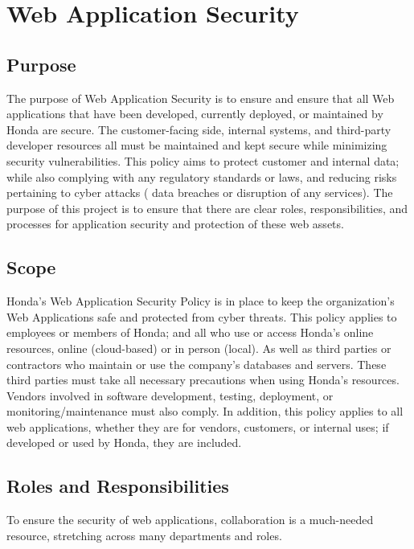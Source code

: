 \chapter{Web Application Security}
\pagestyle{fancy}

\fancyhf{}

\fancyfoot[C]{\thepage}

\renewcommand{\headrulewidth}{0pt}
\renewcommand{\footrulewidth}{0pt}

\section{Purpose}
The purpose of Web Application Security is to ensure and ensure that all Web applications that have been developed, currently deployed, or maintained by Honda are secure.  The customer-facing side, internal systems, and third-party developer resources all must be maintained and kept secure while minimizing security vulnerabilities. This policy aims to protect customer and internal data; while also complying with any regulatory standards or laws, and reducing risks pertaining to cyber attacks ( data breaches or disruption of any services). The purpose of this project is to ensure that there are clear roles, responsibilities, and processes for application security and protection of these web assets.

\section{Scope}
Honda’s Web Application Security Policy is in place to keep the organization's Web Applications safe and protected from cyber threats. This policy applies to employees or members of Honda; and all who use or access Honda's online resources, online (cloud-based) or in person (local). As well as third parties or contractors who maintain or use the company's databases and servers. These third parties must take all necessary precautions when using Honda's resources. Vendors involved in software development, testing, deployment, or monitoring/maintenance must also comply. In addition, this policy applies to all web applications, whether they are for vendors, customers, or internal uses; if developed or used by Honda, they are included.

\section{Roles and Responsibilities}
To ensure the security of web applications, collaboration is a much-needed resource, stretching across many departments and roles.
